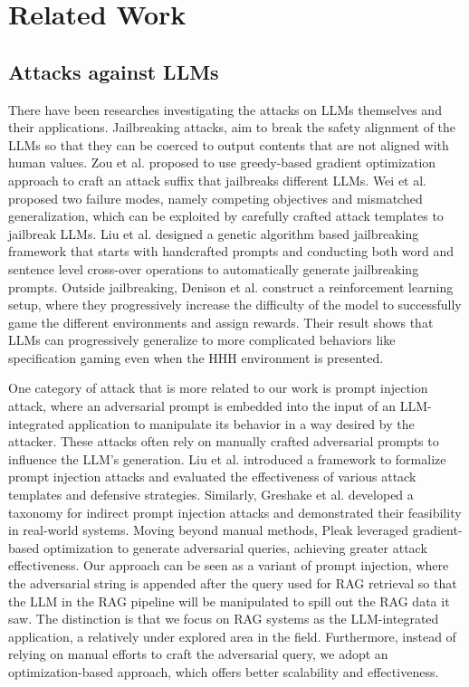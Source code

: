 \section{Related Work}
\subsection{Attacks against LLMs}
There have been researches investigating the attacks on LLMs themselves and their applications. Jailbreaking attacks\cite{andriushchenko_jailbreaking_2024, shen_anything_2023, zhang_boosting_2024, yao_fuzzllm_2024, wang_poisoned_2024, geiping_coercing_2024},  aim to break the safety alignment of the LLMs so that they can be coerced to output contents that are not aligned with human values. Zou et al. \cite{zou_universal_2023} proposed to use greedy-based gradient optimization approach to craft an attack suffix that jailbreaks different LLMs. Wei et al. ~\cite{wei_jailbroken_nodate} proposed two failure modes, namely competing objectives and mismatched generalization, which can be exploited by carefully crafted attack templates to jailbreak LLMs. Liu et al. \cite{liu_autodan_2024} designed a genetic algorithm based jailbreaking framework that starts with handcrafted prompts and conducting both word and sentence level cross-over operations to automatically generate jailbreaking prompts. Outside jailbreaking, Denison et al. \cite{denison_sycophancy_2024} construct a reinforcement learning setup, where they progressively increase the difficulty of the model to successfully game the different environments and assign rewards. Their result shows that LLMs can progressively generalize to more complicated behaviors like specification gaming even when the HHH environment is presented. 

One category of attack that is more related to our work is prompt injection attack, where an adversarial prompt is embedded into the input of an LLM-integrated application to manipulate its behavior in a way desired by the attacker\cite{liu_prompt_2024}. These attacks often rely on manually crafted adversarial prompts to influence the LLM's generation. Liu et al.\cite{liu_formalizing_nodate} introduced a framework to formalize prompt injection attacks and evaluated the effectiveness of various attack templates and defensive strategies. Similarly, Greshake et al.\cite{greshake_not_2023} developed a taxonomy for indirect prompt injection attacks and demonstrated their feasibility in real-world systems. Moving beyond manual methods, Pleak\cite{hui_pleak_2024} leveraged gradient-based optimization to generate adversarial queries, achieving greater attack effectiveness. Our approach can be seen as a variant of prompt injection, where the adversarial string is appended after the query used for RAG retrieval so that the LLM in the RAG pipeline will be manipulated to spill out the RAG data it saw. The distinction is that we focus on RAG systems as the LLM-integrated application, a relatively under explored area in the field. Furthermore, instead of relying on manual efforts to craft the adversarial query, we adopt an optimization-based approach, which offers better scalability and effectiveness.


